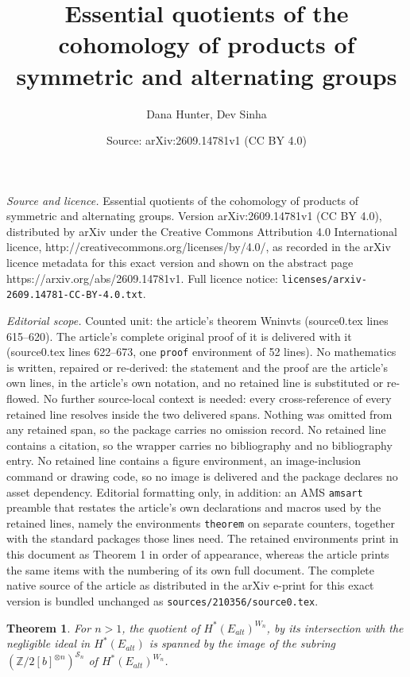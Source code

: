 \documentclass[10pt,a4paper]{amsart}
\title{Essential quotients of the cohomology of products of symmetric and alternating groups}
\author{Dana Hunter, Dev Sinha}
\date{Source: arXiv:2609.14781v1 (CC BY 4.0)}
\newtheorem{theorem}{Theorem}
\newcommand{\Z}{\mathbb{Z}}
\newcommand{\si}{\mathcal{S}}
\begin{document}
\maketitle

\noindent\emph{Source and licence.} Essential quotients of the cohomology of products of symmetric and alternating groups. Version arXiv:2609.14781v1 (CC BY 4.0), distributed by arXiv under the Creative Commons Attribution 4.0 International licence, http://creativecommons.org/licenses/by/4.0/, as recorded in the arXiv licence metadata for this exact version and shown on the abstract page https://arxiv.org/abs/2609.14781v1. Full licence notice: \texttt{licenses/arxiv-2609.14781-CC-BY-4.0.txt}.\par\smallskip

\noindent\textit{Editorial scope.} Counted unit: the article's theorem Wninvts (source0.tex lines 615--620). The article's complete original proof of it is delivered with it (source0.tex lines 622--673, one \texttt{proof} environment of 52 lines). No mathematics is written, repaired or re-derived: the statement and the proof are the article's own lines, in the article's own notation, and no retained line is substituted or re-flowed.  No further source-local context is needed: every cross-reference of every retained line resolves inside the two delivered spans.  Nothing was omitted from any retained span, so the package carries no omission record.  No retained line contains a citation, so the wrapper carries no bibliography and no bibliography entry.  No retained line contains a figure environment, an image-inclusion command or drawing code, so no image is delivered and the package declares no asset dependency.  Editorial formatting only, in addition: an AMS \texttt{amsart} preamble that restates the article's own declarations and macros used by the retained lines, namely the environments \texttt{theorem} on separate counters, together with the standard packages those lines need.  The retained environments print in this document as Theorem 1 in order of appearance, whereas the article prints the same items with the numbering of its own full document.  The complete native source of the article as distributed in the arXiv e-print for this exact version is bundled unchanged as \texttt{sources/210356/source0.tex}.
\begin{theorem}\label{Wninvts}
    For $n>1$, the quotient of $H^*(E_{alt})^{W_n}$, 
    by its intersection with the negligible ideal
in $H^*(E_{alt})$  is spanned
    by the image of the subring $\left( \Z/2[b]^{\otimes n}\right)^{\si_n}$ of $ H^*(E_{alt})^{W_n}$.
\end{theorem}
\end{document}
